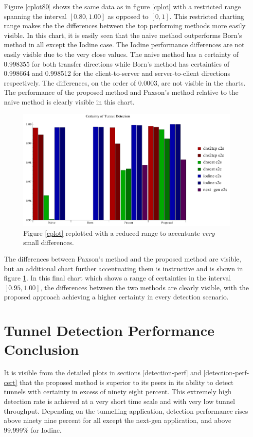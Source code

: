 \documentclass[12pt]{report}
\theoremstyle{remark}
\theoremstyle{definition}
\theoremstyle{definition}
\theoremstyle{definition}
\begin{document}
Figure \ref{cplot80} shows the same data as in figure \ref{cplot} with a
restricted range spanning the interval $[0.80,1.00]$ as opposed to $[0,1]$. This
restricted charting range makes the the differences between the top performing
methods more easily visible. In this chart, it is easily seen that the naive
method outperforms Born's method in all except the Iodine case. The Iodine
performance differences are not easily visible due to the very close values. The
naive method has a certainty of 0.998355 for both transfer directions while
Born's method has certainties of 0.998664 and 0.998512 for the client-to-server
and server-to-client directions respectively. The differences, on the order of
0.0003, are not visible in the charts. The performance of the proposed method
and Paxson's method relative to the naive method is clearly visible in this
chart.

\begin{figure}
\centering
\includegraphics[width=\textwidth]{figures/cplot3.pdf}
\caption[Chart of Certainty of Detection by Tunnel Application and Detection
Method - 0.95 to 1.00]{Figure \ref{cplot} replotted with a reduced range to
accentuate \emph{very} small differences.}
\label{cplot95}
\end{figure}

The differences between Paxson's method and the proposed method are visible, but
an additional chart further accentuating them is instructive and is shown in
figure \ref{cplot95}. In this final chart which shows a range of certainties in
the interval $[0.95,1.00]$, the differences between the two methods are clearly
visible, with the proposed approach achieving a higher certainty in every
detection scenario.

\section{Tunnel Detection Performance Conclusion}
It is visible from the detailed plots in sections \ref{detection-perf} and
\ref{detection-perf-cert} that the proposed method is superior to its peers in
its ability to detect tunnels with certainty in excess of ninety eight percent.
This extremely high detection rate is achieved at a very short time scale and
with very low tunnel throughput. Depending on the tunnelling application,
detection performance rises above ninety nine percent for all except the
next-gen application, and above 99.999\% for Iodine.
\end{document}
